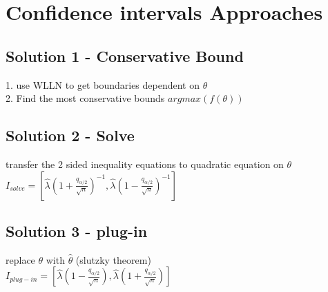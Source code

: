 \section{Confidence intervals Approaches}

\subsection{Solution 1 - Conservative Bound}
1. use WLLN to get boundaries dependent on $\theta$ \\
2. Find the most conservative bounds $argmax(f(\theta))$ \\
\subsection{Solution 2 - Solve}
transfer the 2 sided inequality equations to quadratic equation on $\theta$ \\
$I_{solve} = [\hat{\lambda}(1+\frac{q_{\alpha/2}}{\sqrt{n}})^{-1}, \hat{\lambda}(1-\frac{q_{\alpha/2}}{\sqrt{n}})^{-1}]$
\subsection{Solution 3 - plug-in}
replace $\theta$ with $\hat{\theta}$ (slutzky theorem) \\
$I_{plug-in} = [\hat{\lambda}(1-\frac{q_{\alpha/2}}{\sqrt{n}}), \hat{\lambda}(1+\frac{q_{\alpha/2}}{\sqrt{n}})]$ \\